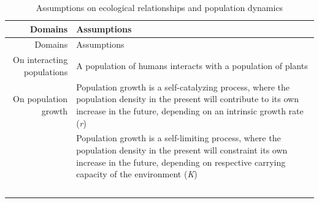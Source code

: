 \documentclass[
]{book}
\begin{document}
\begin{longtable}[]{@{}rl@{}}
\caption{Assumptions on ecological relationships and population dynamics}\tabularnewline
\toprule
\begin{minipage}[b]{0.45\columnwidth}\raggedleft
Domains\strut
\end{minipage} & \begin{minipage}[b]{0.49\columnwidth}\raggedright
Assumptions\strut
\end{minipage}\tabularnewline
\midrule
\endfirsthead
\toprule
\begin{minipage}[b]{0.45\columnwidth}\raggedleft
Domains\strut
\end{minipage} & \begin{minipage}[b]{0.49\columnwidth}\raggedright
Assumptions\strut
\end{minipage}\tabularnewline
\midrule
\endhead
\begin{minipage}[t]{0.45\columnwidth}\raggedleft
On interacting populations\strut
\end{minipage} & \begin{minipage}[t]{0.49\columnwidth}\raggedright
A population of humans interacts with a population of plants\strut
\end{minipage}\tabularnewline
\begin{minipage}[t]{0.45\columnwidth}\raggedleft
On population growth\strut
\end{minipage} & \begin{minipage}[t]{0.49\columnwidth}\raggedright
Population growth is a self-catalyzing process, where the population density in the present will contribute to its own increase in the future, depending on an intrinsic growth rate (\emph{r})\strut
\end{minipage}\tabularnewline
\begin{minipage}[t]{0.45\columnwidth}\raggedleft
﻿\strut
\end{minipage} & \begin{minipage}[t]{0.49\columnwidth}\raggedright
Population growth is a self-limiting process, where the population density in the present will constraint its own increase in the future, depending on respective carrying capacity of the environment (\emph{K})\strut
\end{minipage}\tabularnewline
\begin{minipage}[t]{0.45\columnwidth}\raggedleft
﻿\strut
\end{minipage} & \begin{minipage}[t]{0.49\columnwidth}\raggedright

\end{minipage}
\end{longtable}
\end{document}
